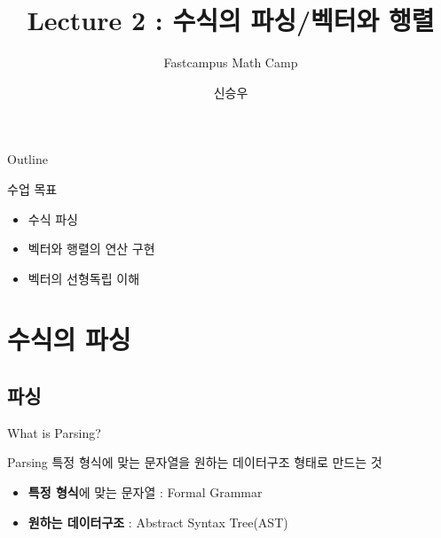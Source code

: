 \documentclass{beamer}
\title{Lecture 2 : 수식의 파싱/벡터와 행렬}
\subtitle{Fastcampus Math Camp}
\author{신승우}
\begin{document}
\begin{frame}
  \titlepage
\end{frame}

\begin{frame}{Outline}
  \tableofcontents[hideallsubsections]
\end{frame}



\begin{frame}{수업 목표} 
\begin{itemize} 
\item 수식 파싱
\item 벡터와 행렬의 연산 구현 
\item 벡터의 선형독립 이해 
\end{itemize}
\end{frame}

\section{수식의 파싱} 

\subsection{파싱} 

\begin{frame}{What is Parsing?} 
\begin{block}{Parsing} 
특정 형식에 맞는 문자열을 원하는 데이터구조 형태로 만드는 것
\end{block}
\begin{itemize} 
\item \textbf{특정 형식}에 맞는 문자열 : Formal Grammar 
\item \textbf{원하는 데이터구조} : Abstract Syntax Tree(AST)
\end{itemize}
\end{frame}

\end{document}
